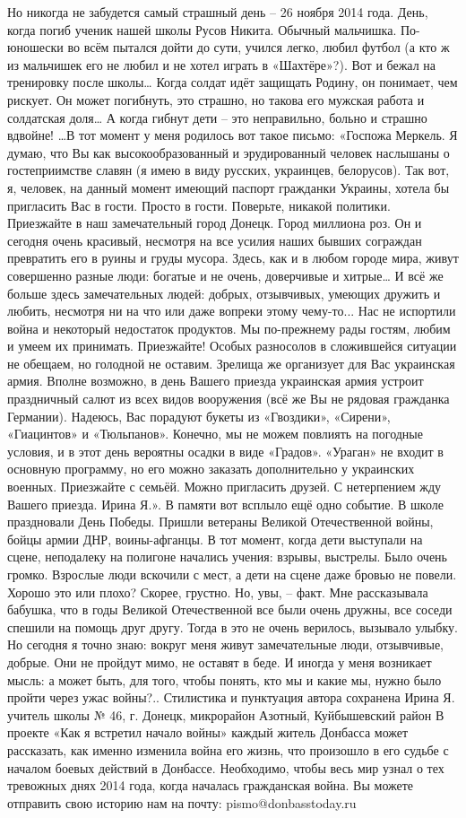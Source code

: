 Но никогда не забудется самый страшный день – 26 ноября 2014 года. День, когда погиб ученик нашей школы Русов Никита. Обычный мальчишка. По-юношески во всём пытался дойти до сути, учился легко, любил футбол (а кто ж из мальчишек его не любил и не хотел играть в «Шахтёре»?). Вот и бежал на тренировку после школы…
Когда солдат идёт защищать Родину, он понимает, чем рискует. Он может погибнуть, это страшно, но такова его мужская работа и солдатская доля… А когда гибнут дети – это неправильно, больно и страшно вдвойне! …В тот момент у меня родилось вот такое письмо:
«Госпожа Меркель. Я думаю, что Вы как высокообразованный и эрудированный человек наслышаны о гостеприимстве славян (я имею в виду русских, украинцев, белорусов). Так вот, я, человек, на данный момент имеющий паспорт гражданки Украины, хотела бы пригласить Вас в гости. Просто в гости. Поверьте, никакой политики.
Приезжайте в наш замечательный город Донецк. Город миллиона роз. Он и сегодня очень красивый, несмотря на все усилия наших бывших сограждан превратить его в руины и груды мусора.
Здесь, как и в любом городе мира, живут совершенно разные люди: богатые и не очень, доверчивые и хитрые… И всё же больше здесь замечательных людей: добрых, отзывчивых, умеющих дружить и любить, несмотря ни на что или даже вопреки этому чему-то...
Нас не испортили война и некоторый недостаток продуктов. Мы по-прежнему рады гостям, любим и умеем их принимать. Приезжайте! Особых разносолов в сложившейся ситуации не обещаем, но голодной не оставим. Зрелища же организует для Вас украинская армия.
Вполне возможно, в день Вашего приезда украинская армия устроит праздничный салют из всех видов вооружения (всё же Вы не рядовая гражданка Германии). Надеюсь, Вас порадуют букеты из «Гвоздики», «Сирени», «Гиацинтов» и «Тюльпанов». Конечно, мы не можем повлиять на погодные условия, и в этот день вероятны осадки в виде «Градов». «Ураган» не входит в основную программу, но его можно заказать дополнительно у украинских военных.
Приезжайте с семьёй. Можно пригласить друзей.
С нетерпением жду Вашего приезда.
Ирина Я.».
В памяти вот всплыло ещё одно событие. В школе праздновали День Победы. Пришли ветераны Великой Отечественной войны, бойцы армии ДНР, воины-афганцы. В тот момент, когда дети выступали на сцене, неподалеку на полигоне начались учения: взрывы, выстрелы. Было очень громко. Взрослые люди вскочили с мест, а дети на сцене даже бровью не повели. Хорошо это или плохо? Скорее, грустно. Но, увы, – факт.
Мне рассказывала бабушка, что в годы Великой Отечественной все были очень дружны, все соседи спешили на помощь друг другу. Тогда в это не очень верилось, вызывало улыбку. Но сегодня я точно знаю: вокруг меня живут замечательные люди, отзывчивые, добрые. Они не пройдут мимо, не оставят в беде.
И иногда у меня возникает мысль: а может быть, для того, чтобы понять, кто мы и какие мы, нужно было пройти через ужас войны?..
Стилистика и пунктуация автора сохранена
Ирина Я. учитель школы № 46,
г. Донецк, микрорайон Азотный,
Куйбышевский район
В проекте «Как я встретил начало войны» каждый житель Донбасса может рассказать, как именно изменила война его жизнь, что произошло в его судьбе с началом боевых действий в Донбассе. Необходимо, чтобы весь мир узнал о тех тревожных днях 2014 года, когда началась гражданская война.
Вы можете отправить свою историю нам на почту: pismo@donbasstoday.ru
